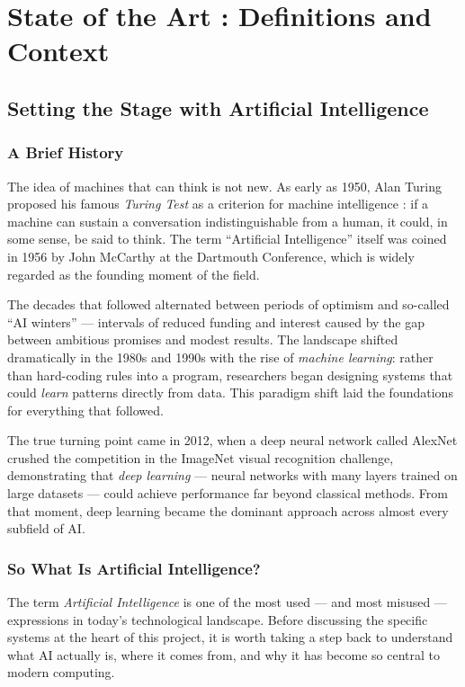 \documentclass[a4paper,11pt]{article}
\begin{document}
\newpage
\section{State of the Art : Definitions and Context}

\subsection{Setting the Stage with Artificial Intelligence}

\subsubsection{A Brief History}
The idea of machines that can think is not new. As early as 1950, Alan
Turing proposed his famous \emph{Turing Test} as a criterion for machine
intelligence \cite{turing1950computing}: if a machine can sustain a
conversation indistinguishable from a human, it could, in some sense, be
said to think. The term ``Artificial Intelligence'' itself was coined in 1956
by John McCarthy at the Dartmouth Conference, which is widely regarded as
the founding moment of the field.
 
The decades that followed alternated between periods of optimism and
so-called ``AI winters'' --- intervals of reduced funding and interest
caused by the gap between ambitious promises and modest results. The
landscape shifted dramatically in the 1980s and 1990s with the rise of
\emph{machine learning}: rather than hard-coding rules into a program,
researchers began designing systems that could \emph{learn} patterns
directly from data. This paradigm shift laid the foundations for everything
that followed.

The true turning point came in 2012, when a deep neural network called
AlexNet \cite{krizhevsky2012alexnet} crushed the competition in the ImageNet
visual recognition challenge, demonstrating that \emph{deep learning} ---
neural networks with many layers trained on large datasets --- could achieve
performance far beyond classical methods. From that moment, deep learning
became the dominant approach across almost every subfield of AI.

\subsubsection{So What Is Artificial Intelligence?}
The term \emph{Artificial Intelligence} is one of the most used --- and most
misused --- expressions in today's technological landscape. Before discussing
the specific systems at the heart of this project, it is worth taking a step
back to understand what AI actually is, where it comes from, and why it has
become so central to modern computing.
\end{document}
